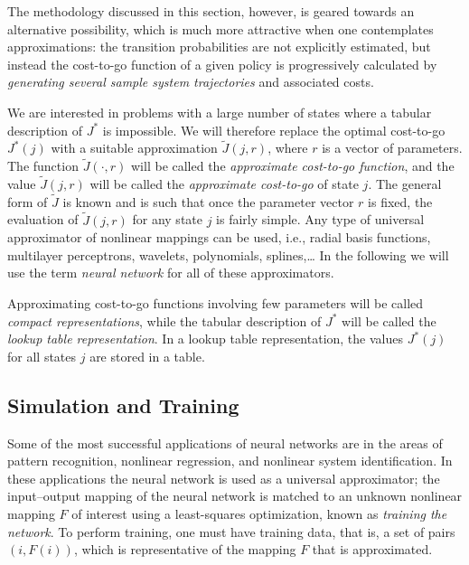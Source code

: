 The methodology discussed in this section, however, is geared towards an alternative possibility, which is much more attractive when one contemplates approximations: the transition probabilities are not explicitly estimated, but instead the cost-to-go function of a given policy is progressively calculated by \emph{generating several sample system trajectories} and associated costs.

We are interested in problems with a large number of states where a tabular description of $J^*$ is impossible. We will therefore replace the optimal cost-to-go $J^*(j)$ with a suitable approximation $\tilde J(j,r)$, where $r$ is a vector of parameters. The function $\tilde J(\cdot,r)$ will be called the \emph{approximate cost-to-go function}, and the value $\tilde J(j,r)$ will be called the \emph{approximate cost-to-go} of state $j$. The general form of $\tilde J$ is known and is such that once the parameter  vector $r$ is fixed, the evaluation of $\tilde J(j,r)$ for any state $j$ is fairly simple. Any type of universal approximator of nonlinear mappings can be used, i.e., radial basis functions, multilayer perceptrons, wavelets, polynomials, splines,\ldots{} In the following we will use the term \emph{neural network} for all of these approximators.

Approximating cost-to-go functions involving few parameters will be called \emph{compact representations}, while the tabular description of $J^*$ will be called the \emph{lookup table representation}. In a lookup table representation, the values $J^*(j)$ for all states $j$ are stored in a table. 








\subsection{Simulation and Training}
Some of the most successful applications of neural networks are in the areas of pattern recognition, nonlinear regression, and nonlinear system identification. In these applications the neural network is used as a universal approximator; the input--output mapping of the neural network is matched to an unknown nonlinear mapping $F$ of interest using a least-squares optimization, known as \emph{training the network}. To perform training, one must have training data, that is, a set of pairs $(i,F(i))$, which is representative of the mapping $F$ that is approximated.


